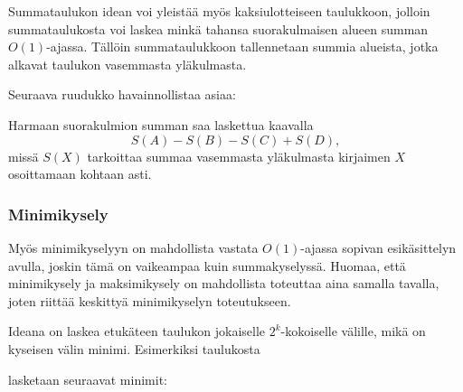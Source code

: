 Summataulukon idean voi yleistää
myös kaksiulotteiseen taulukkoon,
jolloin summataulukosta voi laskea
minkä tahansa suorakulmaisen alueen
summan $O(1)$-ajassa.
Tällöin summataulukkoon tallennetaan summia
alueista, jotka alkavat taulukon vasemmasta yläkulmasta.

\begin{samepage}
Seuraava ruudukko havainnollistaa asiaa:
\begin{center}
\end{center}
\end{samepage}

Harmaan suorakulmion summan saa laskettua kaavalla
\[S(A) - S(B) - S(C) + S(D),\]
missä $S(X)$ tarkoittaa summaa vasemmasta
yläkulmasta kirjaimen $X$ osoittamaan kohtaan asti.

\subsubsection{Minimikysely}

Myös minimikyselyyn on mahdollista
vastata $O(1)$-ajassa sopivan esikäsittelyn avulla,
joskin tämä on vaikeampaa kuin summakyselyssä.
Huomaa, että minimikysely ja maksimikysely on
mahdollista toteuttaa aina samalla tavalla,
joten riittää keskittyä minimikyselyn toteutukseen. 

Ideana on laskea etukäteen taulukon jokaiselle
$2^k$-kokoiselle välille, mikä on kyseisen välin minimi.
Esimerkiksi taulukosta

\begin{center}
\end{center}
lasketaan seuraavat minimit:

